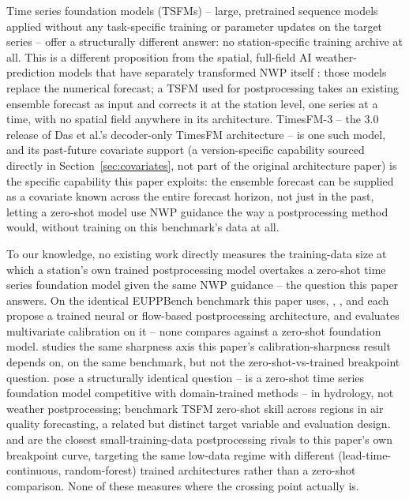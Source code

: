 Time series foundation models (TSFMs) -- large, pretrained sequence models
applied without any task-specific training or parameter updates on the
target series -- offer a structurally different answer: no
station-specific training archive at all. This is a different proposition
from the spatial, full-field AI weather-prediction models that have
separately transformed NWP itself
\citep{lam_2023_graphcast,price_2024_gencast,bodnar_2025_aurora}: those
models replace the numerical forecast; a TSFM used for postprocessing
takes an existing ensemble forecast as input and corrects it at the
station level, one series at a time, with no spatial field anywhere in its
architecture. TimesFM-3 -- the 3.0 release of Das et al.'s decoder-only
TimesFM architecture \citep{das_2024_timesfm_icml} -- is one such model, and
its past-future covariate support (a version-specific capability sourced
directly in Section~\ref{sec:covariates}, not part of the original
architecture paper) is the specific capability this paper exploits: the
ensemble forecast can be supplied as a covariate known across the entire
forecast horizon, not just in the past, letting a zero-shot model use NWP
guidance the way a postprocessing method would, without training on this
benchmark's data at all.

To our knowledge, no existing work directly measures the training-data
size at which a station's own trained postprocessing model overtakes a
zero-shot time series foundation model given the same NWP guidance -- the
question this paper answers. On the identical EUPPBench benchmark this
paper uses, \citet{vanpoecke_2024_transformer},
\citet{mlakar_2023_spline_flows}, and \citet{landry_2025_fmap} each
propose a trained neural or flow-based postprocessing architecture, and
\citet{allen_2023_multivariate_calibration} evaluates multivariate
calibration on it -- none compares against a zero-shot foundation model.
\citet{baran_2026_sharpness_penalty} studies the same sharpness axis this
paper's calibration-sharpness result depends on, on the same benchmark,
but not the zero-shot-vs-trained breakpoint question.
\citet{sun_2026_streamflow_zeroshot} pose a structurally identical
question -- is a zero-shot time series foundation model competitive with
domain-trained methods -- in hydrology, not weather postprocessing;
\citet{bharadwaj_2026_air_quality_arena} benchmark TSFM zero-shot skill
across regions in air quality forecasting, a related but distinct target
variable and evaluation design. \citet{wessel_2024_leadtime_continuous}
and \citet{muschinski_2023_mos_random_forests} are the closest
small-training-data postprocessing rivals to this paper's own breakpoint
curve, targeting the same low-data regime with different
(lead-time-continuous, random-forest) trained architectures rather than a
zero-shot comparison. None of these measures where the crossing point
actually is.

